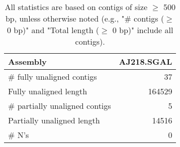 \documentclass[12pt,a4paper]{article}
\begin{document}
\begin{table}[ht]
\begin{center}
\caption{All statistics are based on contigs of size $\geq$ 500 bp, unless otherwise noted (e.g., "\# contigs ($\geq$ 0 bp)" and "Total length ($\geq$ 0 bp)" include all contigs).}
\begin{tabular}{|l*{1}{|r}|}
\hline
Assembly & AJ218.SGAL \\ \hline
\# fully unaligned contigs & 37 \\ \hline
Fully unaligned length & 164529 \\ \hline
\# partially unaligned contigs & 5 \\ \hline
Partially unaligned length & 14516 \\ \hline
\# N's & 0 \\ \hline
\end{tabular}
\end{center}
\end{table}
\end{document}
